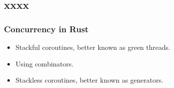 \subsection{xxxx} %
\begin{frame}[fragile]
    \frametitle{Concurrency in Rust}
% 
% 
% 
% 
    \begin{itemize}
        \item Stackful coroutines, better known as green threads.
        \item Using combinators.
        \item Stackless coroutines, better known as generators.
    \end{itemize}
% 
\end{frame}
